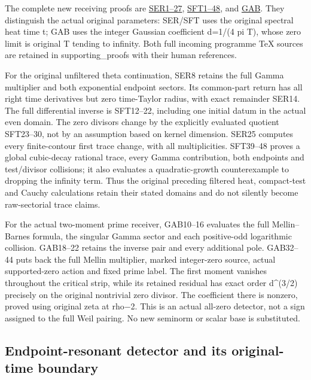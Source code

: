 \documentclass[
  10pt,
  a4paper,
]{article}
\begin{document}
The complete new receiving proofs are
\href{SECTORIAL_ENDPOINT_ZERO_TRACE_RETURN.md}{SER1--27},
\href{SECTORIAL_FILTER_TRACE_DERIVATION.md}{SFT1--48}, and
\href{GAUSSIAN_ARITHMETIC_BOUNDARY_RETURN.md}{GAB}. They distinguish the
actual original parameters: SER/SFT uses the original spectral heat time
t; GAB uses the integer Gaussian coefficient d=1/(4 pi T), whose zero
limit is original T tending to infinity. Both full incoming programme
TeX sources are retained in supporting\_proofs with their human
references.

For the original unfiltered theta continuation, SER8 retains the full
Gamma multiplier and both exponential endpoint sectors. Its common-part
return has all right time derivatives but zero time-Taylor radius, with
exact remainder SER14. The full differential inverse is SFT12--22,
including one initial datum in the actual even domain. The zero divisors
change by the explicitly evaluated quotient SFT23--30, not by an
assumption based on kernel dimension. SER25 computes every
finite-contour first trace change, with all multiplicities. SFT39--48
proves a global cubic-decay rational trace, every Gamma contribution,
both endpoints and test/divisor collisions; it also evaluates a
quadratic-growth counterexample to dropping the infinity term. Thus the
original preceding filtered heat, compact-test and Cauchy calculations
retain their stated domains and do not silently become raw-sectorial
trace claims.

For the actual two-moment prime receiver, GAB10--16 evaluates the full
Mellin--Barnes formula, the singular Gamma sector and each positive-odd
logarithmic collision. GAB18--22 retains the inverse pair and every
additional pole. GAB32--44 puts back the full Mellin multiplier, marked
integer-zero source, actual supported-zero action and fixed prime label.
The first moment vanishes throughout the critical strip, while its
retained residual has exact order d\^{}(3/2) precisely on the original
nontrivial zero divisor. The coefficient there is nonzero, proved using
original zeta at rho−2. This is an actual all-zero detector, not a sign
assigned to the full Weil pairing. No new seminorm or scalar base is
substituted.

\subsection{Endpoint-resonant detector and its original-time
boundary}\label{endpoint-resonant-detector-and-its-original-time-boundary}
\end{document}

